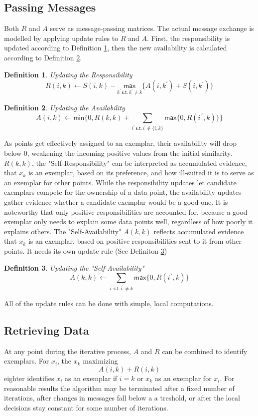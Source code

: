 \documentclass[11pt,a4paper]{article}
\newtheorem{definition}{Definition}
\begin{document}
\subsection{Passing Messages}
Both $R$ and $A$ serve as message-passing matrices. The actual message exchange is modelled by applying update rules to $R$ and $A$. First, the responsibility is updated according to Definition \ref{def:respupdate}, then the new availability is calculated according to Definition \ref{def:avupdate}.
\begin{definition}\label{def:respupdate}
	Updating the Responsibility
	\[
		R(i,k) \leftarrow S(i,k) - \underset{k^\prime\, \mathsf{s.t.}\, k^\prime \neq k}{\mathsf{max}} \{A(i,k^\prime) + S(i,k^\prime)\}
	\]
\end{definition}
\begin{definition}\label{def:avupdate}
	Updating the Availability
	\[
		A(i,k) \leftarrow \mathsf{min}\{0,R(k,k) + \sum\limits_{i^\prime\,\mathsf{s.t.}\, i^\prime \notin \{i,k\}}\mathsf{max}\{0, R(i^{\, \prime} ,k)\}\}
	\]
\end{definition}
As points get effectively assigned to an exemplar, their availability will drop below 0, weakening the incoming positive values from the initial similarity. $R(k,k)$, the "Self-Responsibility" can be interpreted as accumulated evidence, that $x_k$ is an exemplar, based on its preference, and how ill-suited it is to serve as an exemplar for other points. \cite{frey2007clustering} While the responsibility updates let candidate exemplars compete for the ownership of a data point, the availability updates gather evidence whether a candidate exemplar would be a good one. It is noteworthy that only positive responsibilities are accounted for, because a good exemplar only needs to explain some data points well, regardless of how poorly it explains others.\cite{frey2007clustering} The "Self-Availability" $A(k,k)$ reflects accumulated evidence that $x_k$ is an exemplar, based on positive responsibilities sent to it from other points. It needs its own update rule (See Definiton \ref{def:savupdate})
\begin{definition}\label{def:savupdate}
	Updating the "Self-Availability"
	\[
   		A(k,k) \leftarrow \sum\limits_{i^\prime\, \mathsf{s.t.}\, i^\prime \neq k} \mathsf{max} \{0, R(i^{\, \prime} ,k)\}
	\]
\end{definition}
All of the update rules can be done with simple, local computations.\cite{frey2007clustering}
\subsection{Retrieving Data}
At any point during the iterative process, $A$ and $R$ can be combined to identify exemplars. For $x_i$, the $x_k$ maximizing
\[
	A(i,k) + R(i,k)
\]
eighter identifies $x_i$ as an exemplar if $i=k$ or $x_k$ as an exemplar for $x_i$. \cite{frey2007clustering} For reasonable results the algorithm may be terminated after a fixed number of iterations, after changes in messages fall below a a treshold, or after the local decisions stay constant for some number of iterations.\cite{frey2007clustering}
\end{document}
